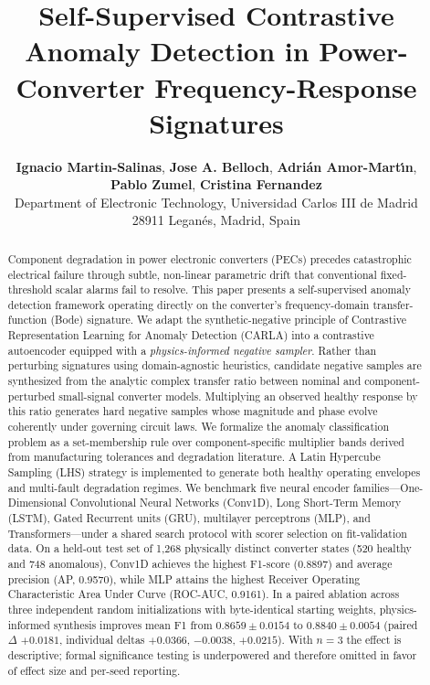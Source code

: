 \documentclass[11pt,a4paper]{article}
\title{\textbf{Self-Supervised Contrastive Anomaly Detection in Power-Converter Frequency-Response Signatures}}
\author{
    \textbf{Ignacio Martin-Salinas}, \textbf{Jose A. Belloch}, \textbf{Adri{\'a}n Amor-Mart{\'\i}n}, \\
    \textbf{Pablo Zumel}, \textbf{Cristina Fernandez} \\
    \small Department of Electronic Technology, Universidad Carlos III de Madrid \\
    \small 28911 Legan{\'e}s, Madrid, Spain
}
\date{}
\begin{document}
\maketitle

\begin{abstract}
Component degradation in power electronic converters (PECs) precedes catastrophic electrical failure through subtle, non-linear parametric drift that conventional fixed-threshold scalar alarms fail to resolve. This paper presents a self-supervised anomaly detection framework operating directly on the converter's frequency-domain transfer-function (Bode) signature. We adapt the synthetic-negative principle of Contrastive Representation Learning for Anomaly Detection (CARLA) into a contrastive autoencoder equipped with a \emph{physics-informed negative sampler}. Rather than perturbing signatures using domain-agnostic heuristics, candidate negative samples are synthesized from the analytic complex transfer ratio between nominal and component-perturbed small-signal converter models. Multiplying an observed healthy response by this ratio generates hard negative samples whose magnitude and phase evolve coherently under governing circuit laws. We formalize the anomaly classification problem as a set-membership rule over component-specific multiplier bands derived from manufacturing tolerances and degradation literature. A Latin Hypercube Sampling (LHS) strategy is implemented to generate both healthy operating envelopes and multi-fault degradation regimes. We benchmark five neural encoder families---One-Dimensional Convolutional Neural Networks (Conv1D), Long Short-Term Memory (LSTM), Gated Recurrent units (GRU), multilayer perceptrons (MLP), and Transformers---under a shared search protocol with scorer selection on fit-validation data. On a held-out test set of 1,268 physically distinct converter states (520 healthy and 748 anomalous), Conv1D achieves the highest F1-score (0.8897) and average precision (AP, 0.9570), while MLP attains the highest Receiver Operating Characteristic Area Under Curve (ROC-AUC, 0.9161). In a paired ablation across three independent random initializations with byte-identical starting weights, physics-informed synthesis improves mean F1 from $0.8659\pm0.0154$ to $0.8840\pm0.0054$ (paired $\Delta$ $+0.0181$, individual deltas $+0.0366$, $-0.0038$, $+0.0215$). With $n=3$ the effect is descriptive; formal significance testing is underpowered and therefore omitted in favor of effect size and per-seed reporting.
\end{abstract}
\end{document}
